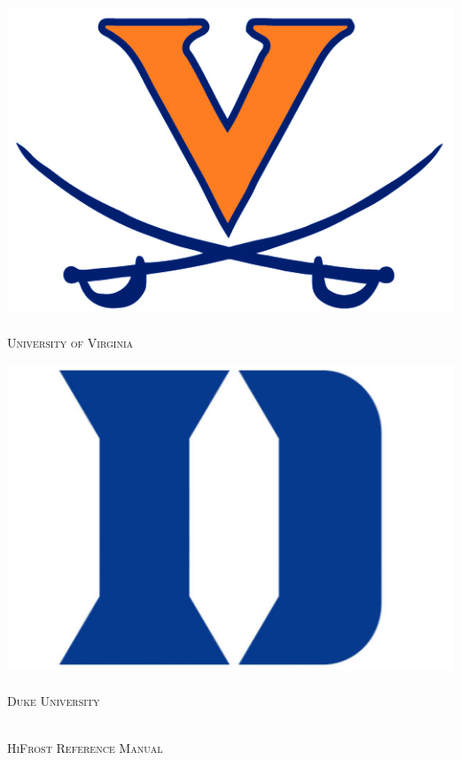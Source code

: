 \begin{titlepage}
\begin{center}

\noindent\begin{minipage}{.4\textwidth}
\centering
\includegraphics[width=\linewidth]{./img/uva-logo.png}~\\[.5cm]
\textsc{\normalsize University of Virginia}\\[1.5cm]
\end{minipage}
\hfill
\noindent\begin{minipage}{.4\textwidth}
\centering
\includegraphics[width=\linewidth]{./img/duke-logo.png}~\\[.5cm]
\textsc{\normalsize Duke University}\\[1.5cm]
\end{minipage}
\\[80pt]
\textsc{\Large HiFrost Reference Manual}\\[0.5cm]


\end{center}
\end{titlepage}
